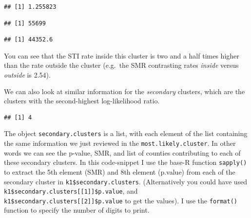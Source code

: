 \documentclass[
]{book}
\newenvironment{Shaded}{\begin{snugshade}}{\end{snugshade}}
\newcommand{\CommentTok}[1]{\textcolor[rgb]{0.56,0.35,0.01}{\textit{#1}}}
\newcommand{\FunctionTok}[1]{\textcolor[rgb]{0.13,0.29,0.53}{\textbf{#1}}}
\newcommand{\NormalTok}[1]{#1}
\newcommand{\SpecialCharTok}[1]{\textcolor[rgb]{0.81,0.36,0.00}{\textbf{#1}}}
\begin{document}
\begin{verbatim}
## [1] 1.255823
\end{verbatim}

\begin{Shaded}
\end{Shaded}

\begin{verbatim}
## [1] 55699
\end{verbatim}

\begin{Shaded}
\end{Shaded}

\begin{verbatim}
## [1] 44352.6
\end{verbatim}

You can see that the STI rate inside this cluster is two and a half times higher than the rate outside the cluster (e.g.~the SMR contrasting rates \emph{inside} versus \emph{outside} is 2.54).

We can also look at similar information for the \emph{secondary} clusters, which are the clusters with the second-highest log-likelihood ratio.

\begin{Shaded}
\end{Shaded}

\begin{verbatim}
## [1] 4
\end{verbatim}

The object \texttt{secondary.clusters} is a list, with each element of the list containing the same information we just reviewed in the \texttt{most.likely.cluster}. In other words we can see the p-value, SMR, and list of counties contributing to each of these secondary clusters. In this code-snippet I use the base-R function \texttt{sapply()} to extract the 5th element (SMR) and 8th element (p.value) from each of the secondary cluster in \texttt{k1\$secondary.clusters}. (Alternatively you could have used \texttt{k1\$secondary.clusters{[}{[}1{]}{]}\$p.value}, and \texttt{k1\$secondary.clusters{[}{[}2{]}{]}\$p.value} to get the values). I use the \texttt{format()} function to specify the number of digits to print.
\end{document}
